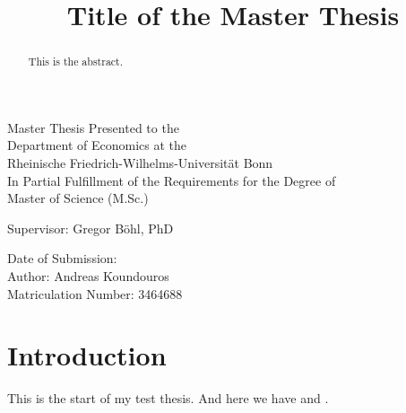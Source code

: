 \documentclass[12pt]{article}
\title{Title of the Master Thesis}
\author{}
\date{}
\numberwithin{equation}{section}
\begin{document}
\maketitle

\vspace{5cm}
\begin{center}
Master Thesis Presented to the\\
Department of Economics at the\\
Rheinische Friedrich-Wilhelms-Universität Bonn\\
\vspace{1cm}
In Partial Fulfillment of the Requirements for the Degree of\\
Master of Science (M.Sc.)
\end{center}

\vspace{5cm}
\begin{center}
Supervisor: Gregor Böhl, PhD

\vspace{2cm}
Date of Submission: \\
Author: Andreas Koundouros\\
Matriculation Number: 3464688
\end{center}

\newpage
{} %
{ \hypersetup{hidelinks} \tableofcontents } %
{ \hypersetup{hidelinks} \listoffigures } %
{ \hypersetup{hidelinks} \listoftables } %

\newpage
{} %
\begin{abstract}
This is the abstract.
\end{abstract}

\newpage
{} %
\section{Introduction}
This is the start of my test thesis. And here we have \textcite{kaplan2018} and \textcite{sw2007}.
\end{document}
